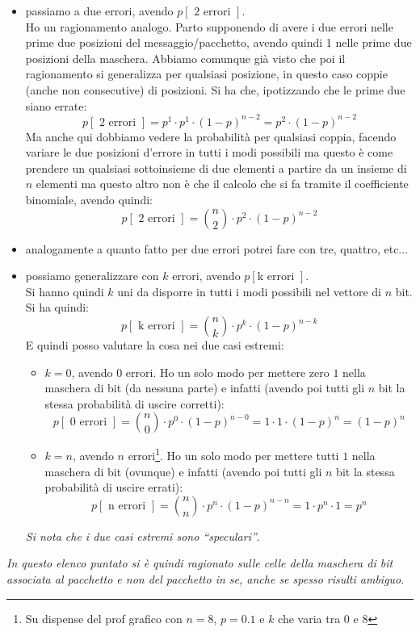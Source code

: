 \documentclass[a4paper,12pt, oneside]{book}
\begin{document}
\begin{itemize}
  \item passiamo a due errori, avendo $p[\mbox{ 2 errori }]$.\\
  Ho un ragionamento analogo. Parto supponendo di avere i due errori nelle prime
  due posizioni del messaggio/pacchetto, avendo quindi 1 nelle prime due
  posizioni della maschera. Abbiamo comunque già visto che poi il ragionamento
  si generalizza per qualsiasi posizione, in questo caso coppie (anche non
  consecutive) di posizioni. Si ha che, ipotizzando che le prime due siano
  errate:
  \[p[\mbox{ 2 errori }]=p^1\cdot p^1\cdot(1-p)^{n-2}=p^2\cdot(1-p)^{n-2}\]
  Ma anche qui dobbiamo vedere la probabilità per qualsiasi coppia, facendo
  variare le due posizioni d'errore in tutti i modi possibili ma questo è come
  prendere un qualsiasi sottoinsieme di due elementi a partire da un insieme di
  $n$ elementi ma questo altro non è che il calcolo che si fa tramite il
  coefficiente binomiale, avendo quindi:
  \[p[\mbox{ 2 errori }]={{n}\choose{2}}\cdot p^2\cdot(1-p)^{n-2}\]
  \item analogamente a quanto fatto per due errori potrei fare con tre,
  quattro, etc$\ldots$
  \item possiamo generalizzare con $k$ errori, avendo $p[\mbox{
    k errori }]$.\\
  Si hanno quindi $k$ uni da disporre in tutti i modi possibili nel vettore di
  $n$ bit. Si ha quindi:
  \[p[\mbox{ k errori }]={{n}\choose{k}}\cdot p^k\cdot(1-p)^{n-k}\]
  E quindi posso valutare la cosa nei due casi estremi:
  \begin{itemize}
    \item $k=0$, avendo 0 errori. Ho un solo modo per mettere zero $1$ nella
    maschera di bit (da nessuna parte) e infatti (avendo poi tutti gli $n$ bit
    la stessa probabilità di uscire corretti): 
    \[p[\mbox{ 0 errori }]={{n}\choose{0}}\cdot p^0\cdot(1-p)^{n-0}=1\cdot
      1\cdot (1-p)^n=(1-p)^n\]
    \item $k=n$, avendo $n$ errori\footnote{Su dispense del prof grafico con
      $n=8$, $p=0.1$ e $k$ che varia tra 0 e 8}. Ho un solo modo per mettere
    tutti $1$ nella  maschera di bit (ovunque) e infatti (avendo poi tutti gli
    $n$ bit la stessa probabilità di uscire errati):
    \[p[\mbox{ n errori }]={{n}\choose{n}}\cdot p^n\cdot(1-p)^{n-n}=1\cdot
      p^n\cdot 1=p^n\]
  \end{itemize}
  \textit{Si nota che i due casi estremi sono ``speculari''}.
\end{itemize}
\textit{In questo elenco puntato si è quindi ragionato sulle celle della
  maschera di bit associata al pacchetto e non del pacchetto in se, anche se
  spesso risulti ambiguo}.\\
\end{document}
